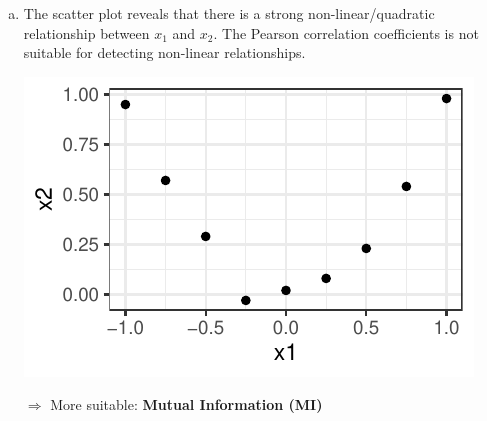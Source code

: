 {\begin{enumerate}[a)]
  \item  The scatter plot reveals that there is a strong non-linear/quadratic relationship between $x_1$ and $x_2$. The Pearson correlation coefficients is not suitable for detecting non-linear relationships.
  
	\begin{center}
	\includegraphics[width=\maxwidth]{figure/add_Points_x1_x2_sol.pdf}
	\end{center}

  \item[$\Rightarrow$] More suitable: \textbf{Mutual Information (MI)}
  

\end{enumerate}}
